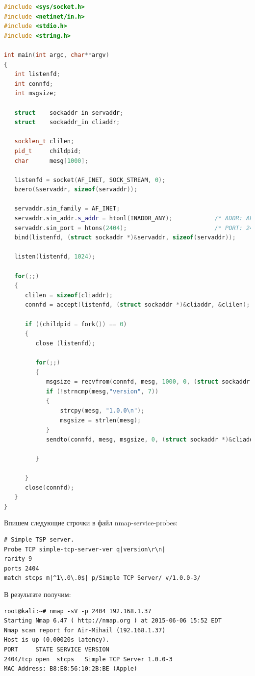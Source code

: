 \documentclass[utf8x, 12pt]{G7-32}
\begin{document}
\begin{lstlisting}[language=C++]
#include <sys/socket.h>
#include <netinet/in.h>
#include <stdio.h>
#include <string.h>

int main(int argc, char**argv)
{
   int listenfd;
   int connfd;
   int msgsize;

   struct    sockaddr_in servaddr;
   struct    sockaddr_in cliaddr;

   socklen_t clilen;
   pid_t     childpid;
   char      mesg[1000];

   listenfd = socket(AF_INET, SOCK_STREAM, 0);
   bzero(&servaddr, sizeof(servaddr));

   servaddr.sin_family = AF_INET;
   servaddr.sin_addr.s_addr = htonl(INADDR_ANY);            /* ADDR: ANY! */
   servaddr.sin_port = htons(2404);                         /* PORT: 2404 */
   bind(listenfd, (struct sockaddr *)&servaddr, sizeof(servaddr));

   listen(listenfd, 1024);

   for(;;)
   {
      clilen = sizeof(cliaddr);
      connfd = accept(listenfd, (struct sockaddr *)&cliaddr, &clilen);

      if ((childpid = fork()) == 0)
      {
         close (listenfd);

         for(;;)
         {
            msgsize = recvfrom(connfd, mesg, 1000, 0, (struct sockaddr *)&cliaddr, &clilen);
            if (!strncmp(mesg,"version", 7))
            {
                strcpy(mesg, "1.0.0\n");
                msgsize = strlen(mesg);
            }
            sendto(connfd, mesg, msgsize, 0, (struct sockaddr *)&cliaddr, sizeof(cliaddr));
            
         }
         
      }
      close(connfd);
   }
}
\end{lstlisting}


Впишем следующие строчки в файл nmap-service-probes:

\begin{lstlisting}
# Simple TSP server.
Probe TCP simple-tcp-server-ver q|version\r\n|
rarity 9
ports 2404
match stcps m|^1\.0\.0$| p/Simple TCP Server/ v/1.0.0-3/
\end{lstlisting}

В результате получим:


\begin{lstlisting}
root@kali:~# nmap -sV -p 2404 192.168.1.37
Starting Nmap 6.47 ( http://nmap.org ) at 2015-06-06 15:52 EDT
Nmap scan report for Air-Mihail (192.168.1.37)
Host is up (0.00020s latency).
PORT     STATE SERVICE VERSION
2404/tcp open  stcps   Simple TCP Server 1.0.0-3
MAC Address: B8:E8:56:10:2B:BE (Apple)
\end{lstlisting}
\end{document}
